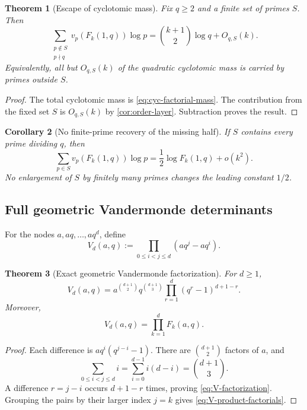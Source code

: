 \documentclass[11pt]{article}
\newtheorem{theorem}{Theorem}[section]
\newtheorem{corollary}[theorem]{Corollary}
\theoremstyle{definition}
\theoremstyle{remark}
\begin{document}
\begin{theorem}[Escape of cyclotomic mass]\label{thm:escape-factorial}
Fix $q\geq2$ and a finite set of primes $S$.  Then
\begin{equation}\label{eq:escape-factorial}
 \sum_{\substack{p\notin S\\p\nmid q}}
   v_p(F_k(1,q))\log p
 =\binom{k+1}{2}\log q+O_{q,S}(k).
\end{equation}
Equivalently, all but $O_{q,S}(k)$ of the quadratic cyclotomic mass is carried
by primes outside $S$.
\end{theorem}

\begin{proof}
The total cyclotomic mass is \eqref{eq:cyc-factorial-mass}.  The contribution
from the fixed set $S$ is $O_{q,S}(k)$ by
\cref{cor:order-layer}.  Subtraction proves the result.
\end{proof}

\begin{corollary}[No finite-prime recovery of the missing half]
\label{cor:no-finite-prime-factorial}
If $S$ contains every prime dividing $q$, then
\[
 \sum_{p\in S}v_p(F_k(1,q))\log p
 =\frac12\log F_k(1,q)+o(k^2).
\]
No enlargement of $S$ by finitely many primes changes the leading constant
$1/2$.
\end{corollary}

\subsection{Full geometric Vandermonde determinants}

For the nodes $a,aq,\ldots,aq^d$, define
\[
 V_d(a,q):=\prod_{0\leq i<j\leq d}(aq^j-aq^i).
\]

\begin{theorem}[Exact geometric Vandermonde factorization]
\label{thm:V-factorization}
For $d\geq1$,
\begin{equation}\label{eq:V-factorization}
 V_d(a,q)
 =a^{\binom{d+1}{2}}
  q^{\binom{d+1}{3}}
  \prod_{r=1}^{d}(q^r-1)^{d+1-r}.
\end{equation}
Moreover,
\begin{equation}\label{eq:V-product-factorials}
 V_d(a,q)=\prod_{k=1}^{d}F_k(a,q).
\end{equation}
\end{theorem}

\begin{proof}
Each difference is $aq^i(q^{j-i}-1)$.  There are
$\binom{d+1}{2}$ factors of $a$, and
\[
 \sum_{0\leq i<j\leq d}i
 =\sum_{i=0}^{d-1}i(d-i)=\binom{d+1}{3}.
\]
A difference $r=j-i$ occurs $d+1-r$ times, proving
\eqref{eq:V-factorization}.  Grouping the pairs by their larger index $j=k$
gives \eqref{eq:V-product-factorials}.
\end{proof}
\end{document}
